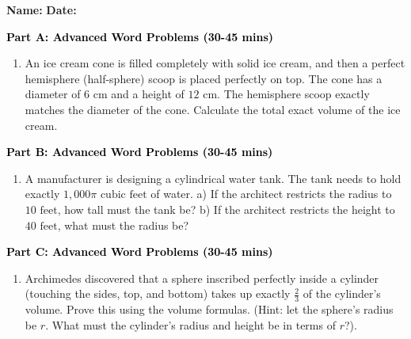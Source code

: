 \documentclass[12pt, letterpaper, fleqn]{article}
\begin{document}
\textbf{Name:} \underline{\hspace{5cm}}
\hfill
\textbf{Date:} \underline{\hspace{3cm}}\\


\begin{tcolorbox}[colback=customteal!20]
\large\textcolor{black}{\textbf{Part A: Advanced Word Problems (30-45 mins)}}
\end{tcolorbox}

\vspace{3mm}

\begin{enumerate}[itemsep=5.5cm, leftmargin=0.6cm]
\item An ice cream cone is filled completely with solid ice cream, and then a perfect hemisphere (half-sphere) scoop is placed perfectly on top. The cone has a diameter of $6\text{ cm}$ and a height of $12\text{ cm}$. The hemisphere scoop exactly matches the diameter of the cone. Calculate the total exact volume of the ice cream.
\end{enumerate}

\newpage

\begin{tcolorbox}[colback=customteal!20]
\large\textcolor{black}{\textbf{Part B: Advanced Word Problems (30-45 mins)}}
\end{tcolorbox}

\vspace{3mm}

\begin{enumerate}[itemsep=5.5cm, leftmargin=0.6cm, resume]
\item A manufacturer is designing a cylindrical water tank. The tank needs to hold exactly $1,000\pi\text{ cubic feet}$ of water. 
a) If the architect restricts the radius to $10\text{ feet}$, how tall must the tank be?
b) If the architect restricts the height to $40\text{ feet}$, what must the radius be?
\end{enumerate}

\newpage

\begin{tcolorbox}[colback=customteal!20]
\large\textcolor{black}{\textbf{Part C: Advanced Word Problems (30-45 mins)}}
\end{tcolorbox}

\vspace{3mm}

\begin{enumerate}[itemsep=5.5cm, leftmargin=0.6cm, resume]
\item Archimedes discovered that a sphere inscribed perfectly inside a cylinder (touching the sides, top, and bottom) takes up exactly $\frac{2}{3}$ of the cylinder's volume. Prove this using the volume formulas. (Hint: let the sphere's radius be $r$. What must the cylinder's radius and height be in terms of $r$?).
\end{enumerate}
\end{document}

